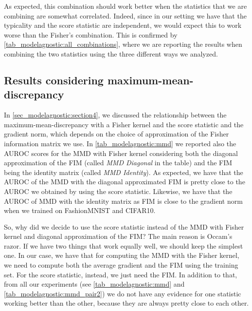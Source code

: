 {As expected, this combination should work better when the statistics that we are combining are somewhat correlated. Indeed, since in our setting we have that the typicality and the score statistic are independent, we would expect this to work worse than the Fisher's combination. This is confirmed by \cref{tab_modelagnostic:all_combinations}, where we are reporting the results when combining the two statistics using the three different ways we analyzed.

\subsection{Results considering maximum-mean-discrepancy}
In \cref{sec_modelagnostic:section4}, we discussed the relationship between the maximum-mean-discrepancy with a Fisher kernel and the score statistic and the gradient norm, which depends on the choice of approximation of the Fisher information matrix we use. In \cref{tab_modelagnostic:mmd} we reported also the AUROC scores for the MMD with Fisher kernel considering both the diagonal approximation of the FIM (called \emph{MMD Diagonal} in the table) and the FIM being the identity matrix (called \emph{MMD Identity}). As expected, we have that the AUROC of the MMD with the diagonal approximated FIM is pretty close to the AUROC we obtained by using the score statistic. Likewise, we have that the AUROC of MMD with the identity matrix as FIM is close to the gradient norm when we trained on FashionMNIST and CIFAR10. 

So, why did we decide to use the score statistic instead of the MMD with Fisher kernel and diagonal approximation of the FIM? The main reason is Occam's razor. If we have two things that work equally well, we should keep the simplest one. In our case, we have that for computing the MMD with the Fisher kernel, we need to compute both the average gradient and the FIM using the training set. For the score statistic, instead, we just need the FIM. In addition to that, from all our experiments (see \cref{tab_modelagnostic:mmd} and \cref{tab_modelagnostic:mmd_pair2}) we do not have any evidence for one statistic working better than the other, because they are always pretty close to each other.

}
